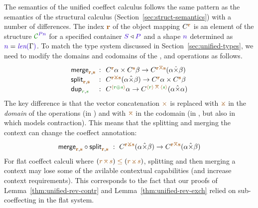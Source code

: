 The semantics of the unified coeffect calculus follows the same pattern as the semantics of the
structural calculus (Section~\ref{sec:struct-semantics}) with a number of differences. The 
index $\aclrd{\textbf{r}}$ of the object mapping $\ctyp{\aclrd{\textbf{r}}}$ is an element of 
the structure $\C^{\SP \sclrd{n}}$ for a specified container $\SH \triangleleft \SP$ and a shape 
$\sclrd{n}$ determined as $\sclrd{n} = \slen{\Gamma}$. To match the type system discussed in 
Section~\ref{sec:unified-types}, we need to modify the domains and codomains of the , 
 and  operations as follows.
%
\begin{equation*}
\begin{array}{lcl}
 \ident{merge}_{\aclrd{\textbf{r}},\aclrd{\textbf{s}}} &\narrow{:}& 
  \ctyp{\aclrd{\textbf{r}}}{\alpha} \times \ctyp{\aclrd{\textbf{s}}}{\beta} \rightarrow \ctyp{\aclrd{\textbf{r}}\azip\aclrd{\textbf{s}}}{(\alpha \xtimes \beta)} \\
 \ident{split}_{\aclrd{\textbf{r}},\aclrd{\textbf{s}}} &\narrow{:}& 
  \ctyp{\aclrd{\textbf{r}}\apar\aclrd{\textbf{s}}}{(\alpha \xtimes \beta)} \rightarrow \ctyp{\aclrd{\textbf{r}}}{\alpha} \times \ctyp{\aclrd{\textbf{s}}}{\beta} \\
 \ident{dup}_{\cclrd{r}, \cclrd{s}} &\narrow{:}& 
  \ctyp{\alift{\cclrd{r} \cpar \cclrd{s}}}{\alpha} \rightarrow \ctyp{\alift{\cclrd{r}}\,\azip\,\alift{\cclrd{s}}}{(\alpha \xtimes \alpha)} \\
\end{array}
\end{equation*}
%
The key difference is that the vector concatenation $\atimes$ is replaced with $\apar$ in the
\emph{domain} of the operations (in ) and with $\azip$ in the codomain
(in , but also in  which models contraction).
This means that the splitting and merging the context can change the coeffect annotation:
%
\begin{equation*}
\ident{merge}_{\aclrd{\textbf{r}},\aclrd{\textbf{s}}} \circ \ident{split}_{\aclrd{\textbf{r}},\aclrd{\textbf{s}}} ~:~
  \ctyp{\aclrd{\textbf{r}}\apar\aclrd{\textbf{s}}}{(\alpha \xtimes \beta)}
  \rightarrow \ctyp{\aclrd{\textbf{r}}\azip\aclrd{\textbf{s}}}{(\alpha \xtimes \beta)} 
\end{equation*}
%
For flat coeffect calculi where $(\aclrd{r}\,\azip\,\aclrd{s}) \;\aclrd{\leq}\; (\aclrd{r}\,\apar\,\aclrd{s})$,
splitting and then merging a context may lose some of the avilable contextual capabilities
(and increase context requirements). This corresponds to the fact that our proofs of 
Lemma~\ref{thm:unified-rev-contr} and Lemma~\ref{thm:unified-rev-exch} relied on sub-coeffecting
in the flat system.

